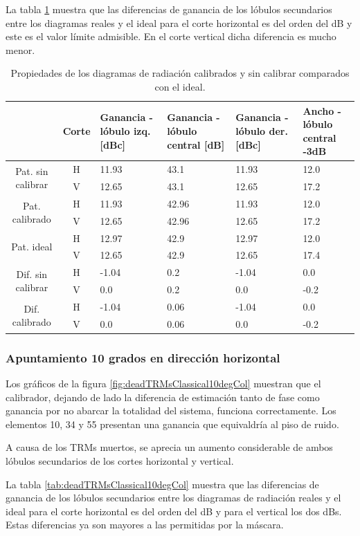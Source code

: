 La tabla \ref{tab:deadTRMsClassical0deg} muestra que las diferencias de ganancia de los lóbulos secundarios entre los diagramas 
reales y el ideal para el corte horizontal es del orden del dB y  este es el valor límite admisible. En el corte vertical dicha 
diferencia es mucho menor.

\begin{table}[H]
  \footnotesize
  \centering
  \begin{tabular}{|c|c|p{2cm}|p{2.5cm}|p{2.5cm}|p{2.5cm}|}
    \cline{2-6}
    \multicolumn{1}{c|}{} & Corte & Ganancia - lóbulo izq. [dBc] & Ganancia - lóbulo central [dB] &
    Ganancia - lóbulo der. [dBc] & Ancho - lóbulo central -3dB \tabularnewline\hline
    \multirow{2}{2cm}{Pat. sin calibrar} & H & 11.93 & 43.1 & 11.93 & 12.0 \tabularnewline\cline{2-6}
     & V & 12.65 & 43.1 & 12.65 & 17.2 \tabularnewline\hline
    \multirow{2}{2cm}{Pat. calibrado} & H & 11.93 & 42.96 & 11.93 & 12.0 \tabularnewline\cline{2-6}
     & V & 12.65 & 42.96 & 12.65 & 17.2 \tabularnewline\hline
    \multirow{2}{2cm}{Pat. ideal} & H & 12.97 & 42.9 & 12.97 & 12.0 \tabularnewline\cline{2-6}
     & V & 12.65 & 42.9 & 12.65 & 17.4 \tabularnewline\hline
    \multirow{2}{2cm}{Dif. sin calibrar} & H & -1.04 & 0.2 & -1.04 & 0.0\tabularnewline\cline{2-6}
     & V & 0.0 & 0.2 & 0.0 & -0.2 \tabularnewline\hline
    \multirow{2}{2cm}{Dif. calibrado} & H & -1.04 & 0.06 & -1.04 & 0.0 \tabularnewline\cline{2-6}
     & V & 0.0 & 0.06 & 0.0 & -0.2 \tabularnewline\hline
  \end{tabular}
  \caption{Propiedades de los diagramas de radiación calibrados y sin calibrar comparados con el ideal.}
  \label{tab:deadTRMsClassical0deg}
\end{table}


\subsubsection{Apuntamiento 10 grados en dirección horizontal}

Los gráficos de la figura \ref{fig:deadTRMsClassical10degCol} muestran que el calibrador, dejando de lado la diferencia de 
estimación tanto de fase como ganancia por no abarcar la totalidad del sistema, funciona correctamente. Los elementos 10, 34 y 
55 presentan una ganancia que equivaldría al piso de ruido.

A causa de los TRMs muertos, se aprecia un aumento considerable de ambos lóbulos secundarios de los cortes horizontal y vertical.

La tabla \ref{tab:deadTRMsClassical10degCol} muestra que las diferencias de ganancia de los lóbulos secundarios entre los 
diagramas de radiación reales y el ideal para el corte horizontal es del orden del dB y para el vertical los dos dBs. Estas 
diferencias ya son mayores a las permitidas por la máscara.

